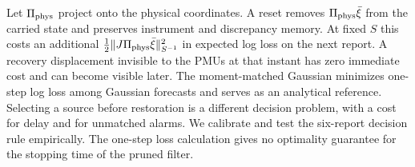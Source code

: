Let $\Pi_{\rm phys}$ project onto the physical coordinates. A reset removes
$\Pi_{\rm phys}\bar\xi$ from the carried state and preserves instrument
and discrepancy memory.
At fixed $S$ this costs an additional
$\tfrac12\|J\Pi_{\rm phys}\bar\xi\|_{S^{-1}}^2$ in expected log loss
on the next report. A recovery displacement invisible to the PMUs at
that instant has zero immediate cost and can become visible later. The
moment-matched Gaussian minimizes one-step log loss among Gaussian
forecasts and serves as an analytical reference. Selecting a source
before restoration is a different decision problem, with a cost for
delay and for unmatched alarms. We calibrate and test the six-report
decision rule empirically. The one-step loss calculation gives no
optimality guarantee for the stopping time of the pruned filter.
